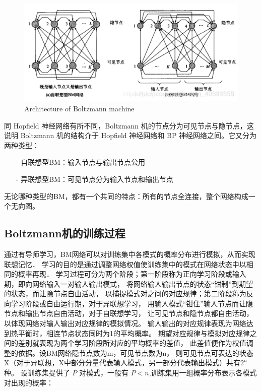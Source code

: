 \begin{figure}[H]
\centering
\includegraphics[scale=0.382]{pix/Boltzmann/Boltzmann_machine_architecture.png}
\caption{Architecture of Boltzmann machine}
\label{fig:Boltzmann_machine_architecture}
\end{figure}

同 Hopfield 神经网络有所不同，Boltzmann 机的节点分为可见节点与隐节点，这说明 Boltzmann 
机的结构介于 Hopfield 神经网络和 BP 神经网络之间。它又分为两种类型：

\begin{itemize}
\setlength{\parskip}{0pt}
\item[-]
自联想型BM：输入节点与输出节点公用

\item[-]
异联想型BM：可见节点分为输入节点和输出节点
\end{itemize}

无论哪种类型的BM，都有一个共同的特点：所有的节点全连接，整个网络构成一个无向图。


\subsection{Boltzmann机的训练过程}

通过有导师学习，BM网络可以对训练集中各模式的概率分布进行模拟，从而实现联想记忆．
学习的目的是通过调整网络权值使训练集中的模式在网络状态中以相同的概率再现．
学习过程可分为两个阶段；第一阶段称为正向学习阶段或输入期，即向网络输入一对输人输出模式，
将网络输人输出节点的状态“钳制”到期望的状态，而让隐节点自由活动，
以捕捉模式对之间的对应规律；第二阶段称为反向学习阶段或自由运行期，对于异联想学习，
用输人模式“钳住”输人节点而让隐节点和输出节点自由活动，对于自联想学习，
让可见节点和隐节点都自由活动，以体现网络对输人输出对应规律的模拟情况。
输人输出的对应规律表现为网络达到热平衡时，相连节点状态同时为1的平均概率。
期望对应规律与模拟对应规律之间的差别就表现为两个学习阶段所对应的平均概率的差值，
此差值便作为权值调整的依据。设BM网络隐节点数为m，可见节点数为n，
则可见节点可表达的状态X（对于异联想，X中部分分量代表输人模式，另一部分代表输出模式）共有$2^n$ 种。
设训练集提供了 $P$ 对模式，一般有 $P<n$,训练集用一组概率分布表示各模式对出现的概率：


